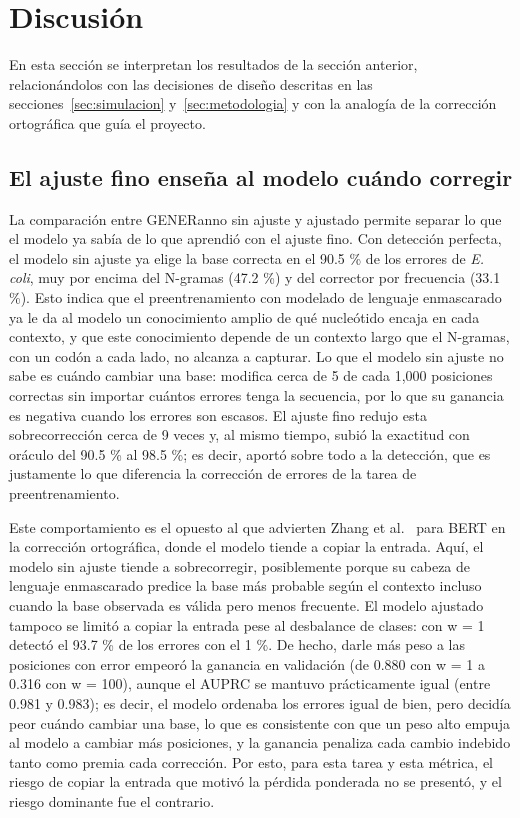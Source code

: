 \documentclass[sigconf,nonacm]{acmart}
\begin{document}
\section{Discusión}\label{sec:discusion}

En esta sección se interpretan los resultados de la sección anterior, relacionándolos con las decisiones de diseño descritas en las secciones~\ref{sec:simulacion} y~\ref{sec:metodologia} y con la analogía de la corrección ortográfica que guía el proyecto.

\subsection{El ajuste fino enseña al modelo cuándo corregir}\label{sec:disc-ajuste}

La comparación entre GENERanno sin ajuste y ajustado permite separar lo que el modelo ya sabía de lo que aprendió con el ajuste fino. Con detección perfecta, el modelo sin ajuste ya elige la base correcta en el 90.5 \% de los errores de \emph{E. coli}, muy por encima del N-gramas (47.2 \%) y del corrector por frecuencia (33.1 \%). Esto indica que el preentrenamiento con modelado de lenguaje enmascarado ya le da al modelo un conocimiento amplio de qué nucleótido encaja en cada contexto, y que este conocimiento depende de un contexto largo que el N-gramas, con un codón a cada lado, no alcanza a capturar. Lo que el modelo sin ajuste no sabe es cuándo cambiar una base: modifica cerca de 5 de cada 1,000 posiciones correctas sin importar cuántos errores tenga la secuencia, por lo que su ganancia es negativa cuando los errores son escasos. El ajuste fino redujo esta sobrecorrección cerca de 9 veces y, al mismo tiempo, subió la exactitud con oráculo del 90.5 \% al 98.5 \%; es decir, aportó sobre todo a la detección, que es justamente lo que diferencia la corrección de errores de la tarea de preentrenamiento.

Este comportamiento es el opuesto al que advierten Zhang et al.~\cite{zhang2020spelling} para BERT en la corrección ortográfica, donde el modelo tiende a copiar la entrada. Aquí, el modelo sin ajuste tiende a sobrecorregir, posiblemente porque su cabeza de lenguaje enmascarado predice la base más probable según el contexto incluso cuando la base observada es válida pero menos frecuente. El modelo ajustado tampoco se limitó a copiar la entrada pese al desbalance de clases: con w = 1 detectó el 93.7 \% de los errores con el 1 \%. De hecho, darle más peso a las posiciones con error empeoró la ganancia en validación (de 0.880 con w = 1 a 0.316 con w = 100), aunque el AUPRC se mantuvo prácticamente igual (entre 0.981 y 0.983); es decir, el modelo ordenaba los errores igual de bien, pero decidía peor cuándo cambiar una base, lo que es consistente con que un peso alto empuja al modelo a cambiar más posiciones, y la ganancia penaliza cada cambio indebido tanto como premia cada corrección. Por esto, para esta tarea y esta métrica, el riesgo de copiar la entrada que motivó la pérdida ponderada no se presentó, y el riesgo dominante fue el contrario.
\end{document}
